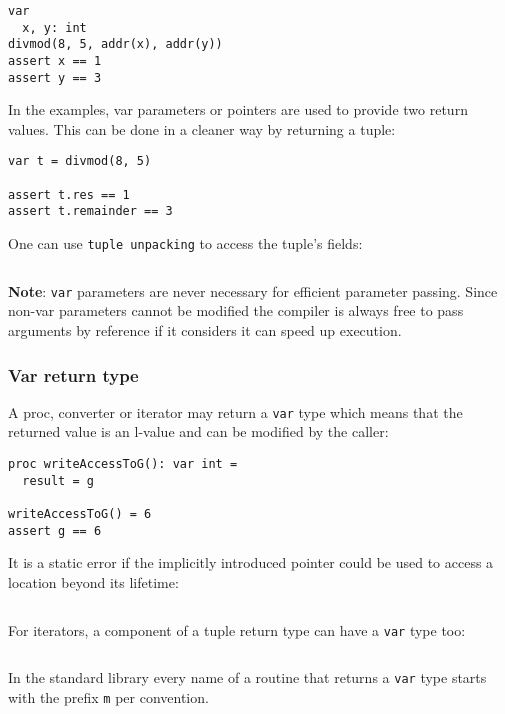\begin{verbatim}
var
  x, y: int
divmod(8, 5, addr(x), addr(y))
assert x == 1
assert y == 3
\end{verbatim}

In the examples, var parameters or pointers are used to provide two
return values. This can be done in a cleaner way by returning a tuple:

\begin{verbatim}
var t = divmod(8, 5)

assert t.res == 1
assert t.remainder == 3
\end{verbatim}

One can use \texttt{tuple\ unpacking} to access the tuple's fields:

\begin{verbatim}
\end{verbatim}

\textbf{Note}: \texttt{var} parameters are never necessary for efficient
parameter passing. Since non-var parameters cannot be modified the
compiler is always free to pass arguments by reference if it considers
it can speed up execution.

\hypertarget{var-return-type}{%
\subsubsection{Var return type}\label{var-return-type}}

A proc, converter or iterator may return a \texttt{var} type which means
that the returned value is an l-value and can be modified by the caller:

\begin{verbatim}
proc writeAccessToG(): var int =
  result = g

writeAccessToG() = 6
assert g == 6
\end{verbatim}

It is a static error if the implicitly introduced pointer could be used
to access a location beyond its lifetime:

\begin{verbatim}
\end{verbatim}

For iterators, a component of a tuple return type can have a
\texttt{var} type too:

\begin{verbatim}
\end{verbatim}

In the standard library every name of a routine that returns a
\texttt{var} type starts with the prefix \texttt{m} per convention.

